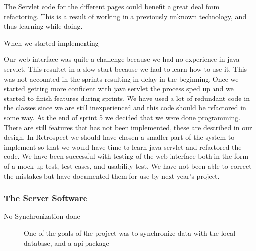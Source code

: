 The Servlet code for the different pages could benefit a great deal form refactoring. This is a result of working in a previously unknown technology, and thus learning while doing.

When we started implementing
	
Our web interface was quite a challenge because we had no experience in java servlet. This resultet in a slow start because we had to learn how to use it. This was not accounted in the sprints resulting in delay in the beginning. Once we started getting more confident with java servlet the process sped up and we started to finish features during sprints.
We have used a lot of redundant code in the classes since we are still inexperienced and this code should be refactored in some way. At the end of sprint 5 we decided that we were done programming. There are still features that has not been implemented, these are described in our design.
In Retrospect we should have chosen a smaller part of the system to implement so that we would have time to learn java servlet and refactored the code. We have been successful with testing of the web interface both in the form of a mock up test, test cases, and usability test.
We have not been able to correct the mistakes but have documented them for use by next year's project.

\subsubsection*{The Server Software}
\begin{description}
 \item[No Synchronization done] One of the goals of the project was to synchronize data with the local database, and a api package 
\end{description}


